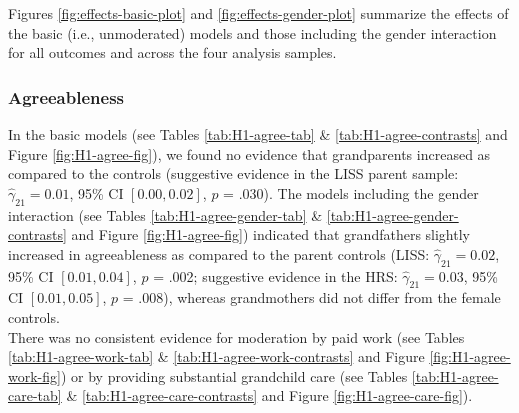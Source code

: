 \documentclass[
  english,
  man, noextraspace,floatsintext]{apa7}
\begin{document}
Figures \ref{fig:effects-basic-plot} and \ref{fig:effects-gender-plot} summarize the effects of the basic (i.e., unmoderated) models and those including the gender interaction for all outcomes and across the four analysis samples.

\hypertarget{agreeableness}{%
\subsubsection{Agreeableness}\label{agreeableness}}

In the basic models (see Tables \ref{tab:H1-agree-tab} \& \ref{tab:H1-agree-contrasts} and Figure \ref{fig:H1-agree-fig}), we found no evidence that grandparents increased as compared to the controls (suggestive evidence in the LISS parent sample: \(\hat{\gamma}_{21} = 0.01\), 95\% CI \([0.00, 0.02]\), \(p\) = .030). The models including the gender interaction (see Tables \ref{tab:H1-agree-gender-tab} \& \ref{tab:H1-agree-gender-contrasts} and Figure \ref{fig:H1-agree-fig}) indicated that grandfathers slightly increased in agreeableness as compared to the parent controls (LISS: \(\hat{\gamma}_{21} = 0.02\), 95\% CI \([0.01, 0.04]\), \(p\) = .002; suggestive evidence in the HRS: \(\hat{\gamma}_{21} = 0.03\), 95\% CI \([0.01, 0.05]\), \(p\) = .008), whereas grandmothers did not differ from the female controls.\\
There was no consistent evidence for moderation by paid work (see Tables \ref{tab:H1-agree-work-tab} \& \ref{tab:H1-agree-work-contrasts} and Figure \ref{fig:H1-agree-work-fig}) or by providing substantial grandchild care (see Tables \ref{tab:H1-agree-care-tab} \& \ref{tab:H1-agree-care-contrasts} and Figure \ref{fig:H1-agree-care-fig}).
\end{document}
